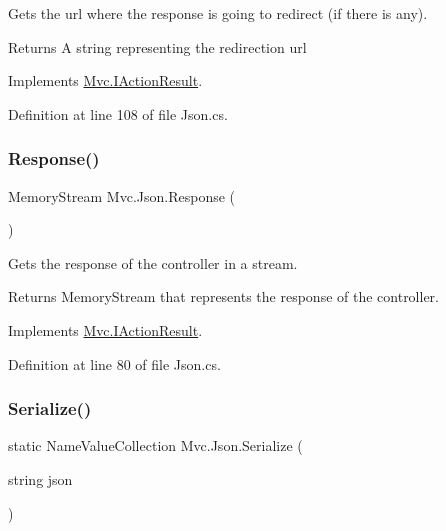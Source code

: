 Gets the url where the response is going to redirect (if there is any). 

\begin{DoxyReturn}{Returns}
A string representing the redirection url
\end{DoxyReturn}


Implements \hyperlink{interface_mvc_1_1_i_action_result_a036707da116ea300eae90e105b8d1ced}{Mvc.\+I\+Action\+Result}.



Definition at line 108 of file Json.\+cs.

\mbox{\label{class_mvc_1_1_json_ae94043bfe0049a44c8b0c61a13b61ac9}} 
\subsubsection{\texorpdfstring{Response()}{Response()}}
{\footnotesize\ttfamily Memory\+Stream Mvc.\+Json.\+Response (\begin{DoxyParamCaption}{ }\end{DoxyParamCaption})}



Gets the response of the controller in a stream. 

\begin{DoxyReturn}{Returns}
Memory\+Stream that represents the response of the controller.
\end{DoxyReturn}


Implements \hyperlink{interface_mvc_1_1_i_action_result_a7cf7423071384c7b2bac75a5f4d6e25c}{Mvc.\+I\+Action\+Result}.



Definition at line 80 of file Json.\+cs.

\mbox{\label{class_mvc_1_1_json_a6876cfad310dbe0a704204bec09c9d66}} 
\subsubsection{\texorpdfstring{Serialize()}{Serialize()}}
{\footnotesize\ttfamily static Name\+Value\+Collection Mvc.\+Json.\+Serialize (\begin{DoxyParamCaption}\item[{string}]{json }\end{DoxyParamCaption})\hspace{0.3cm}{\ttfamily [static]}}



